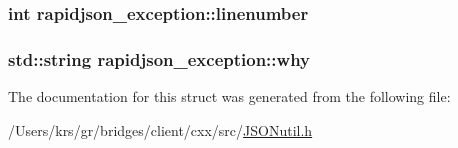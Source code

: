 \subsubsection[{linenumber}]{\setlength{\rightskip}{0pt plus 5cm}int rapidjson\+\_\+exception\+::linenumber}\label{structrapidjson__exception_a9c0263f853d8a17911e29cae66708e67}
\hypertarget{structrapidjson__exception_a6b432b89bd7052332bc923f274249e1e}{}
\subsubsection[{why}]{\setlength{\rightskip}{0pt plus 5cm}std\+::string rapidjson\+\_\+exception\+::why}\label{structrapidjson__exception_a6b432b89bd7052332bc923f274249e1e}


The documentation for this struct was generated from the following file\+:\begin{DoxyCompactItemize}
\item 
/\+Users/krs/gr/bridges/client/cxx/src/\hyperlink{_j_s_o_nutil_8h}{J\+S\+O\+Nutil.\+h}\end{DoxyCompactItemize}
